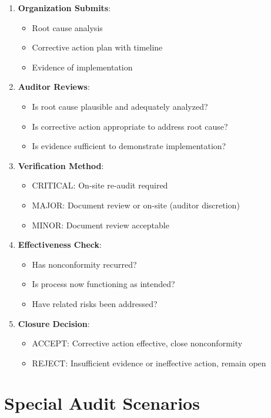 \documentclass[11pt,a4paper]{article}
\begin{document}
\begin{enumerate}
\item \textbf{Organization Submits}:
  \begin{itemize}
  \item Root cause analysis
  \item Corrective action plan with timeline
  \item Evidence of implementation
  \end{itemize}

\item \textbf{Auditor Reviews}:
  \begin{itemize}
  \item Is root cause plausible and adequately analyzed?
  \item Is corrective action appropriate to address root cause?
  \item Is evidence sufficient to demonstrate implementation?
  \end{itemize}

\item \textbf{Verification Method}:
  \begin{itemize}
  \item CRITICAL: On-site re-audit required
  \item MAJOR: Document review or on-site (auditor discretion)
  \item MINOR: Document review acceptable
  \end{itemize}

\item \textbf{Effectiveness Check}:
  \begin{itemize}
  \item Has nonconformity recurred?
  \item Is process now functioning as intended?
  \item Have related risks been addressed?
  \end{itemize}

\item \textbf{Closure Decision}:
  \begin{itemize}
  \item ACCEPT: Corrective action effective, close nonconformity
  \item REJECT: Insufficient evidence or ineffective action, remain open
  \end{itemize}
\end{enumerate}

\section{Special Audit Scenarios}
\end{document}
